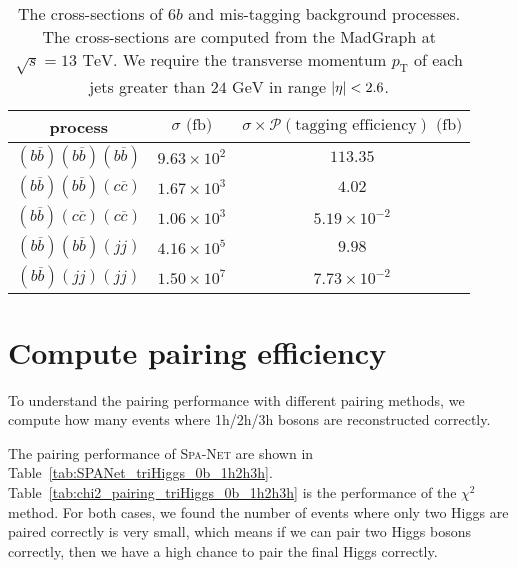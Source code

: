 \documentclass[12pt]{article}
\begin{document}
	\begin{table}[htpb]
		\centering
		\caption{The cross-sections of $6b$ and mis-tagging background processes. The cross-sections are computed from the MadGraph at $\sqrt{s} = 13 \text{ TeV}$. We require the transverse momentum $p_{\text{T}}$ of each jets greater than $\text{24 GeV}$ in range $\abs{\eta} < 2.6$.}
		\label{tab:cross_section_of_mis_tagging_background_w_cuts}
		\begin{tabular}{c|cc}
		process                                         & $\sigma\text{ (fb)}$ & $\sigma\times\mathcal{P}(\text{tagging efficiency})\text{ (fb)}$ \\ \hline
		$(b\overline{b})(b\overline{b})(b\overline{b})$ & $9.63 \times 10^{2}$ & $113.35$                                                         \\
		$(b\overline{b})(b\overline{b})(c\overline{c})$ & $1.67 \times 10^{3}$ & $4.02$                                                           \\
		$(b\overline{b})(c\overline{c})(c\overline{c})$ & $1.06 \times 10^{3}$ & $5.19 \times 10^{-2}$                                            \\
		$(b\overline{b})(b\overline{b})(jj)$            & $4.16 \times 10^{5}$ & $9.98$                                                           \\
		$(b\overline{b})(jj)(jj)$                       & $1.50 \times 10^{7}$ & $7.73 \times 10^{-2}$                                           
		\end{tabular}
	\end{table}
\section{Compute pairing efficiency}%
\label{sec:compute_pairing_efficiency}
	To understand the pairing performance with different pairing methods, we compute how many events where 1h/2h/3h bosons are reconstructed correctly.

	The pairing performance of \textsc{Spa-Net} are shown in Table~\ref{tab:SPANet_triHiggs_0b_1h2h3h}. Table~\ref{tab:chi2_pairing_triHiggs_0b_1h2h3h} is the performance of the $\chi^2$ method. For both cases, we found the number of events where only two Higgs are paired correctly is very small, which means if we can pair two Higgs bosons correctly, then we have a high chance to pair the final Higgs correctly.
\end{document}
